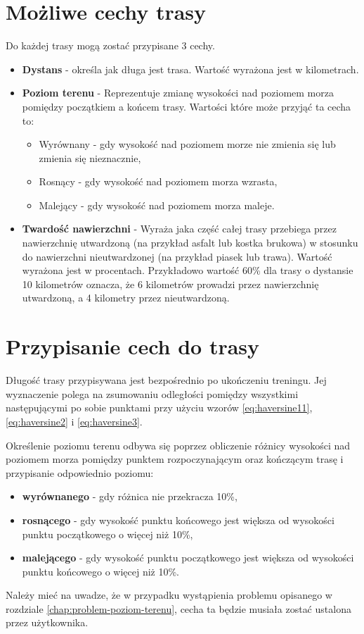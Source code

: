 \section{Możliwe cechy trasy}\label{chap:opis-cech}
Do każdej trasy mogą zostać przypisane 3 cechy.
\begin{itemize}
\item{\textbf{Dystans}} - określa jak długa jest trasa. Wartość wyrażona jest w kilometrach.
\item{\textbf{Poziom terenu}} - Reprezentuje zmianę wysokości nad poziomem morza pomiędzy początkiem a końcem trasy. Wartości które może przyjąć ta cecha to:
\begin{itemize}
\item{Wyrównany} - gdy wysokość nad poziomem morze nie zmienia się lub zmienia się nieznacznie,
\item{Rosnący} - gdy wysokość nad poziomem morza wzrasta,
\item{Malejący} - gdy wysokość nad poziomem morza maleje.
\end{itemize}
\item{\textbf{Twardość nawierzchni}} - Wyraża jaka część całej trasy przebiega przez nawierzchnię utwardzoną (na przykład asfalt lub kostka brukowa) w stosunku do nawierzchni nieutwardzonej (na przykład piasek lub trawa). Wartość wyrażona jest w procentach. Przykładowo wartość 60\% dla trasy o dystansie 10 kilometrów oznacza, że 6 kilometrów prowadzi przez nawierzchnię utwardzoną, a 4 kilometry przez nieutwardzoną.
\end{itemize}
\section{Przypisanie cech do trasy}\label{chap:przypisanie-cech}
Długość trasy przypisywana jest bezpośrednio po ukończeniu treningu. Jej wyznaczenie polega na zsumowaniu odległości pomiędzy wszystkimi następującymi po sobie punktami przy użyciu wzorów \ref{eq:haversine11},  \ref{eq:haversine2} i \ref{eq:haversine3}.

Określenie poziomu terenu odbywa się poprzez obliczenie różnicy wysokości nad poziomem morza pomiędzy punktem rozpoczynającym oraz kończącym trasę i przypisanie odpowiednio poziomu:
\begin{itemize}
\item{\textbf{wyrównanego}} - gdy różnica nie przekracza 10\%,
\item{\textbf{rosnącego}} - gdy wysokość punktu końcowego jest większa od wysokości punktu początkowego o więcej niż 10\%,
\item{\textbf{malejącego}} - gdy wysokość punktu początkowego jest większa od wysokości punktu końcowego o więcej niż 10\%.
\end {itemize}
Należy mieć na uwadze, że w przypadku wystąpienia problemu opisanego w rozdziale \ref{chap:problem-poziom-terenu}, cecha ta będzie musiała zostać ustalona przez użytkownika.

